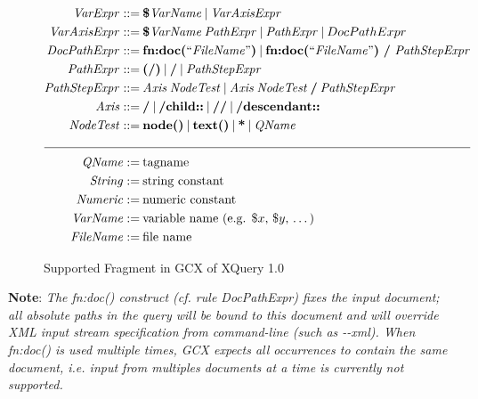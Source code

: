 \begin{figure}[ht]
\begin{align*}
    \mtext{VarExpr} ::= & \mspaceb \text{\textbf{\$}\memph{VarName}} \mspaceb | \mspaceb \mtext{VarAxisExpr} \\
    \mtext{VarAxisExpr} ::= & \mspaceb \text{\textbf{\$}\memph{VarName}} \mspaceb \mtext{PathExpr} \mspaceb | \mspaceb \mtext{PathExpr} \mspaceb | \mspaceb DocPathExpr \\
    \mtext{DocPathExpr} ::= & \mspaceb \text{\textbf{fn:doc(}``\memph{FileName}''\textbf{)}} \mspaceb | \mspaceb \text{\textbf{fn:doc(}``\memph{FileName}''\textbf{)} \textbf{/} \mtext{PathStepExpr}} \\
    \mtext{PathExpr} ::= & \mspaceb \text{\textbf{(/)}} \mspaceb | \mspaceb \text{\textbf{/}} \mspaceb | \mspaceb \mtext{PathStepExpr} \\
    \mtext{PathStepExpr} ::= & \mspaceb \mtext{Axis} \mspaceb \mtext{NodeTest} \mspaceb | \mspaceb \mtext{Axis} \mspaceb \mtext{NodeTest} \mspaceb \text{\textbf{/}} \mspaceb \mtext{PathStepExpr} \\
    \mtext{Axis} ::= & \mspaceb \text{\textbf{/}} \mspaceb | \mspaceb \text{\textbf{/child::}} \mspaceb | \mspaceb \text{\textbf{//}} \mspaceb | \mspaceb \text{\textbf{/descendant::}} \\
    \mtext{NodeTest} ::= & \mspaceb \text{\textbf{node()}} \mspaceb | \mspaceb \text{\textbf{text()}} \mspaceb | \mspaceb \text{\textbf{*}} \mspaceb | \mspaceb \mtext{QName} \\
    \cline{1-3}
    \mtext{QName} := & \mspaceb \text{tagname} \\
    \mtext{String} := & \mspaceb \text{string constant} \\
    \mtext{Numeric} := & \mspaceb \text{numeric constant} \\
    \mtext{VarName} := & \mspaceb \text{variable name (e.g. $\$x$, $\$y$, \ldots)} \\
    \mtext{FileName} := & \mspaceb \text{file name} \\
  \end{align*}
  \caption[Supported Fragment in GCX of XQuery 1.0]{Supported Fragment in GCX of XQuery 1.0}
  \label{figure_(supported_fragment_of_xquery):supported_fragment_in_gcx_of_xquery}
\end{figure}

\clearpage

\noindent \textbf{Note}: \emph{The fn:doc() construct (cf. rule DocPathExpr) fixes the input document;
all absolute paths in the query will be bound to this document and will override XML input stream specification from command-line (such as {-}{-}xml). When fn:doc() is used multiple times, GCX expects all occurrences to contain the same document, i.e. input from multiples documents at a time is currently not supported.} 
